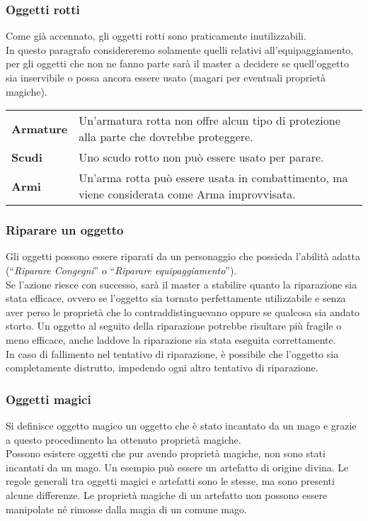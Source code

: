 \documentclass[../manuale_main.tex]{subfiles}
\begin{document}
\subsubsection{Oggetti rotti}
Come già accennato, gli oggetti rotti sono praticamente inutilizzabili.\\
In questo paragrafo considereremo solamente quelli relativi all'equipaggiamento, per gli oggetti che non ne fanno parte sarà il master a decidere se quell'oggetto sia inservibile o possa ancora essere usato (magari per eventuali proprietà magiche).\\
\renewcommand{\arraystretch}{1.5}
\begin{tabularx}{\linewidth}{l X}
\textbf{Armature}&Un'armatura rotta non offre alcun tipo di protezione alla parte che dovrebbe proteggere.\\
\textbf{Scudi}&Uno scudo rotto non può essere usato per parare.\\
\textbf{Armi}&Un'arma rotta può essere usata in combattimento, ma viene considerata come Arma improvvisata.\\
\end{tabularx}

\subsubsection{Riparare un oggetto}
Gli oggetti possono essere riparati da un personaggio che possieda l'abilità adatta (``\emph{Riparare Congegni}'' o ``\emph{Riparare equipaggiamento}'').\\
Se l'azione riesce con successo, sarà il master a stabilire quanto la riparazione sia stata efficace, ovvero se l'oggetto sia tornato perfettamente utilizzabile e senza aver perso le proprietà che lo contraddistinguevano oppure se qualcosa sia andato storto. Un oggetto al seguito della riparazione potrebbe risultare più fragile o meno efficace, anche laddove la riparazione sia stata eseguita correttamente.\\
In caso di fallimento nel tentativo di riparazione, è possibile che l'oggetto sia completamente distrutto, impedendo ogni altro tentativo di riparazione.


\subsubsection{Oggetti magici}

Si definisce oggetto magico un oggetto che è stato incantato da un mago e grazie a questo procedimento ha ottenuto proprietà magiche.\\
Possono esistere oggetti che pur avendo proprietà magiche, non sono stati incantati da un mago. Un esempio può essere un artefatto di origine divina. Le regole generali tra oggetti magici e artefatti sono le stesse, ma sono presenti alcune differenze. Le proprietà magiche di un artefatto non possono essere manipolate né rimosse dalla magia di un comune mago.\\
\end{document}

